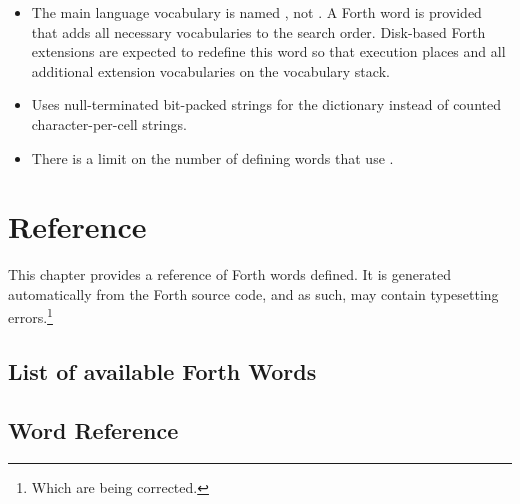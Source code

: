 \begin{itemize}
  \item The main language vocabulary is named , not
    . A Forth word  is provided that adds all
    necessary vocabularies to the search order. Disk-based Forth
    extensions are expected to redefine this word so that execution
    places  and all additional extension vocabularies on
    the vocabulary stack.
  \item Uses null-terminated bit-packed strings for the dictionary
    instead of counted character-per-cell strings.
  \item There is a limit on the number of defining words that use
    .
\end{itemize}

\chapter{Reference}

This chapter provides a reference of Forth words defined. It is
generated automatically from the Forth source code, and as such, may
contain typesetting errors.\footnote{Which are being corrected.}

\section{List of available Forth Words}




\section{Word Reference}

